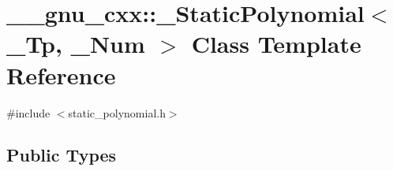\hypertarget{class____gnu__cxx_1_1__StaticPolynomial}{}\section{\+\_\+\+\_\+gnu\+\_\+cxx\+:\+:\+\_\+\+Static\+Polynomial$<$ \+\_\+\+Tp, \+\_\+\+Num $>$ Class Template Reference}
\label{class____gnu__cxx_1_1__StaticPolynomial}


{\ttfamily \#include $<$static\+\_\+polynomial.\+h$>$}

\subsection*{Public Types}
